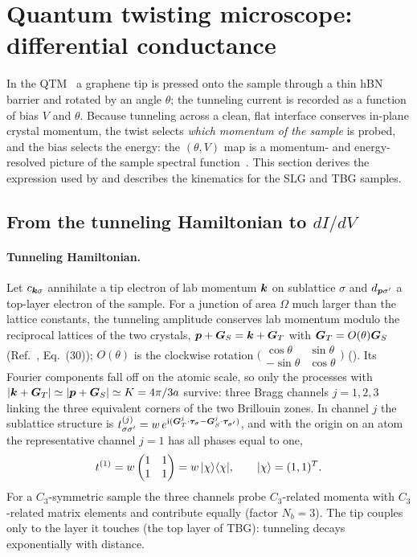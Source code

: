 \section{Quantum twisting microscope: differential conductance}
\label{sec:qtm}

In the QTM~\cite{Inbar2023} a graphene tip is pressed onto the sample through a thin hBN barrier and rotated by
an angle $\theta$; the tunneling current is recorded as a function of bias $V$ and $\theta$. Because tunneling
across a clean, flat interface conserves in-plane crystal momentum, the twist selects \emph{which momentum of the
sample} is probed, and the bias selects the energy: the $(\theta,V)$ map is a momentum- and energy-resolved
picture of the sample spectral function~\cite{Wei2025b,Wei2025}. This section derives the expression used by
 and describes the kinematics for the SLG and TBG samples.

\subsection{From the tunneling Hamiltonian to $dI/dV$}

\paragraph{Tunneling Hamiltonian.} Let $c_{\bm k\sigma}$ annihilate a tip electron of lab momentum $\bm k$ on sublattice
$\sigma$ and $d_{\bm p\sigma'}$ a top-layer electron of the sample. For a junction of area $\Omega$ much larger than
the lattice constants, the tunneling amplitude conserves lab momentum modulo the reciprocal lattices of the two
crystals, $\bm p+\bm G_S=\bm k+\bm G_T$ with $\bm G_T=O(\theta)\bm G_S$ (Ref.~\cite{Wei2025}, Eq.~(30)); $O(\theta)$ is the
clockwise rotation $\bigl(\begin{smallmatrix}\cos\theta&\sin\theta\\-\sin\theta&\cos\theta\end{smallmatrix}\bigr)$
(). Its Fourier components fall off on the atomic scale, so only the processes with
$|\bm k+\bm G_T|\simeq|\bm p+\bm G_S|\simeq K=4\pi/3a$ survive: three Bragg channels $j=1,2,3$ linking the three
equivalent corners of the two Brillouin zones. In channel $j$ the sublattice structure is
$t^{(j)}_{\sigma\sigma'}=w\,e^{\mathrm i(\bm G^j_T\cdot\bm\tau_\sigma-\bm G^j_S\cdot\bm\tau_{\sigma'})}$, and with the origin on
an atom the representative channel $j=1$ has all phases equal to one,
\begin{equation}
t^{(1)}=w\begin{pmatrix}1&1\\1&1\end{pmatrix}=w\,|\chi\rangle\langle \chi|,\qquad |\chi\rangle=(1,1)^T .
\label{eq:tunnelmatrix}
\end{equation}
For a $C_3$-symmetric sample the three channels probe $C_3$-related momenta with $C_3$-related matrix elements and
contribute equally (factor $N_b=3$). The tip couples only to the layer it touches (the top layer of TBG):
tunneling decays exponentially with distance.

